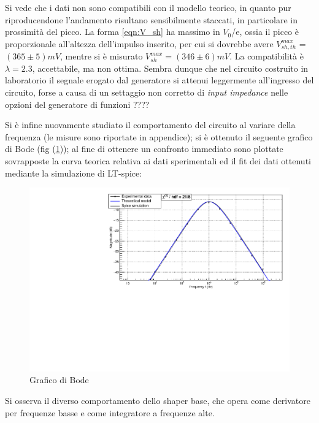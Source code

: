 \documentclass{article}
\begin{document}
Si vede che i dati non sono compatibili con il modello teorico, in quanto pur riproducendone l'andamento risultano sensibilmente 
staccati, in particolare in prossimità del picco. La forma \ref{eqn:V_sh} ha massimo in $V_0$/e, ossia il picco è proporzionale all'altezza dell'impulso
inserito, per cui si dovrebbe avere $V_{sh,th}^{max}$ = $(365 \pm 5) mV $, mentre si è misurato  $V_{sh}^{max}=(346 \pm 6)mV$. La compatibilità è $\lambda=2.3$,
accettabile, ma non ottima. Sembra dunque che nel circuito costruito in laboratorio il segnale erogato dal generatore si attenui leggermente all'ingresso del
circuito, forse a causa di un settaggio non corretto di \textit{input impedance} nelle opzioni del generatore di funzioni  ????

Si è infine nuovamente studiato il comportamento del circuito al variare della frequenza (le misure sono riportate in appendice); si è 
ottenuto il seguente grafico di Bode (fig (\ref{fig:bodeshaper_no_pz})); al fine di ottenere un confronto immediato sono plottate 
sovrapposte la curva teorica relativa ai dati sperimentali ed il fit dei dati ottenuti mediante la simulazione di LT-spice:

\begin{center}
    \begin{figure}[H]
    \centering
    \includegraphics[scale=0.375, angle=0]{bodeshaper_no_pz.pdf}
    \caption{Grafico di Bode}
    \label{fig:bodeshaper_no_pz}
    \end{figure}
\end{center}

Si osserva il diverso comportamento dello shaper base, che opera come derivatore per frequenze basse e come integratore a frequenze
alte.
\end{document}
